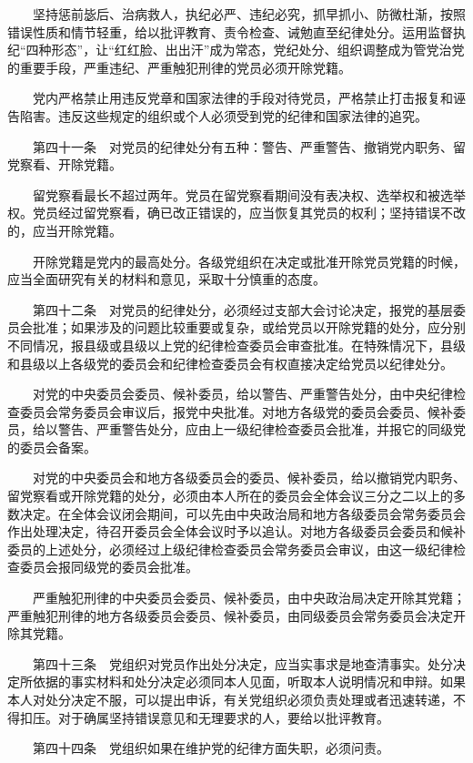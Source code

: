 　　坚持惩前毖后、治病救人，执纪必严、违纪必究，抓早抓小、防微杜渐，按照错误性质和情节轻重，给以批评教育、责令检查、诫勉直至纪律处分。运用监督执纪“四种形态”，让“红红脸、出出汗”成为常态，党纪处分、组织调整成为管党治党的重要手段，严重违纪、严重触犯刑律的党员必须开除党籍。

　　党内严格禁止用违反党章和国家法律的手段对待党员，严格禁止打击报复和诬告陷害。违反这些规定的组织或个人必须受到党的纪律和国家法律的追究。

　　第四十一条　对党员的纪律处分有五种：警告、严重警告、撤销党内职务、留党察看、开除党籍。

　　留党察看最长不超过两年。党员在留党察看期间没有表决权、选举权和被选举权。党员经过留党察看，确已改正错误的，应当恢复其党员的权利；坚持错误不改的，应当开除党籍。

　　开除党籍是党内的最高处分。各级党组织在决定或批准开除党员党籍的时候，应当全面研究有关的材料和意见，采取十分慎重的态度。

　　第四十二条　对党员的纪律处分，必须经过支部大会讨论决定，报党的基层委员会批准；如果涉及的问题比较重要或复杂，或给党员以开除党籍的处分，应分别不同情况，报县级或县级以上党的纪律检查委员会审查批准。在特殊情况下，县级和县级以上各级党的委员会和纪律检查委员会有权直接决定给党员以纪律处分。

　　对党的中央委员会委员、候补委员，给以警告、严重警告处分，由中央纪律检查委员会常务委员会审议后，报党中央批准。对地方各级党的委员会委员、候补委员，给以警告、严重警告处分，应由上一级纪律检查委员会批准，并报它的同级党的委员会备案。

　　对党的中央委员会和地方各级委员会的委员、候补委员，给以撤销党内职务、留党察看或开除党籍的处分，必须由本人所在的委员会全体会议三分之二以上的多数决定。在全体会议闭会期间，可以先由中央政治局和地方各级委员会常务委员会作出处理决定，待召开委员会全体会议时予以追认。对地方各级委员会委员和候补委员的上述处分，必须经过上级纪律检查委员会常务委员会审议，由这一级纪律检查委员会报同级党的委员会批准。

　　严重触犯刑律的中央委员会委员、候补委员，由中央政治局决定开除其党籍；严重触犯刑律的地方各级委员会委员、候补委员，由同级委员会常务委员会决定开除其党籍。

　　第四十三条　党组织对党员作出处分决定，应当实事求是地查清事实。处分决定所依据的事实材料和处分决定必须同本人见面，听取本人说明情况和申辩。如果本人对处分决定不服，可以提出申诉，有关党组织必须负责处理或者迅速转递，不得扣压。对于确属坚持错误意见和无理要求的人，要给以批评教育。

　　第四十四条　党组织如果在维护党的纪律方面失职，必须问责。

